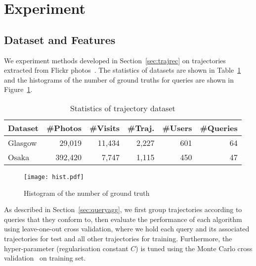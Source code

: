 \section{Experiment}
\label{sec:experiment}

\subsection{Dataset and Features}
\label{sec:dataset}

We experiment methods developed in Section~\ref{sec:trajrec} on trajectories extracted from Flickr photos~\cite{thomee2016yfcc100m}.
The statistics of datasets are shown in Table~\ref{tab:data} and 
the histograms of the number of ground truths for queries are shown in Figure~\ref{fig:hist}.

\begin{table}[t]
\caption{Statistics of trajectory dataset}
\label{tab:data}
\centering
\setlength{\tabcolsep}{4pt} %
\small
\begin{tabular}{l*{5}{r}} \hline
\textbf{Dataset} & \textbf{\#Photos} & \textbf{\#Visits} & \textbf{\#Traj.} & \textbf{\#Users} & \textbf{\#Queries} \\ \hline
Glasgow & 29,019 & 11,434 & 2,227 & 601 & 64 \\
Osaka & 392,420 & 7,747 & 1,115 & 450 & 47 \\
\hline
\end{tabular}
\end{table}


\begin{figure}[t]
	\centering
	\texttt{[image: hist.pdf]}
	\caption{Histogram of the number of ground truth}
	\label{fig:hist}
\end{figure}


As described in Section~\ref{sec:queryagg}, 
we first group trajectories according to queries that they conform to,
then evaluate the performance of each algorithm using leave-one-out cross validation,
where we hold each query and its associated trajectories for test and all other trajectories for training.
Furthermore, 
the hyper-parameter (regularisation constant $C$) is tuned using the Monte Carlo cross validation~\cite{burman1989comparative} on training set.

